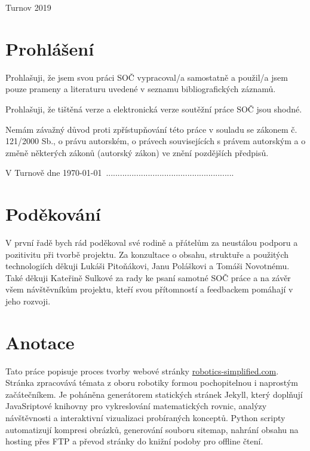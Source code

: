 \documentclass[a4paper, 12pt]{article}
\begin{document}
  \fontsize{12}{14.4} \selectfont
  Turnov 2019

  \vspace{4em}

  \newpage

  \section*{\normalfont\textbf{Prohlášení}}
  Prohlašuji, že jsem svou práci SOČ vypracoval/a samostatně a použil/a jsem pouze prameny a literaturu uvedené v seznamu bibliografických záznamů.

  Prohlašuji, že tištěná verze a elektronická verze soutěžní práce SOČ jsou shodné.

  Nemám závažný důvod proti zpřístupňování této práce v souladu se zákonem č. 121/2000 Sb., o právu autorském, o právech souvisejících s právem autorským a o změně některých zákonů (autorský zákon) ve znění pozdějších předpisů.

  \qquad

  V Turnově dne \today \, .......................................................\\%

  \newpage

  \section*{\normalfont\textbf{Poděkování}}
  V první řadě bych rád poděkoval své rodině a přátelům za neustálou podporu a pozitivitu při tvorbě projektu. Za konzultace o obsahu, struktuře a použitých technologiích děkuji Lukáši Pitoňákovi, Janu Poláškovi a Tomáši Novotnému. Také děkuji Kateřině Sulkové za rady ke psaní samotné SOČ práce a na závěr všem návštěvníkům projektu, kteří svou přítomností a feedbackem pomáhají v jeho rozvoji.


  \newpage

  \section*{\normalfont\textbf{Anotace}}
  Tato práce popisuje proces tvorby webové stránky \url{robotics-simplified.com}. Stránka zpracovává témata z oboru robotiky formou pochopitelnou i naprostým začátečníkem. Je poháněna generátorem statických stránek Jekyll, který doplňují JavaSriptové knihovny pro vykreslování matematických rovnic, analýzy návštěvnosti a interaktivní vizualizaci probíraných konceptů. Python scripty automatizují kompresi obrázků, generování souboru sitemap, nahrání obsahu na hosting přes FTP a převod stránky do knižní podoby pro offline čtení.
\end{document}
